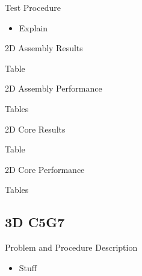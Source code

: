 \begin{frame}[t]{Test Procedure}
    
    \begin{itemize}
        \item Explain
    \end{itemize}
    
\end{frame}


\begin{frame}[t]{2D Assembly Results}
    
    Table
    
\end{frame}


\begin{frame}[t]{2D Assembly Performance}

Tables

\end{frame}


\begin{frame}[t]{2D Core Results}

Table

\end{frame}


\begin{frame}[t]{2D Core Performance}

Tables

\end{frame}


\subsection{3D C5G7}
\begin{frame}[t]{Problem and Procedure Description}
    
    \begin{itemize}
        \item Stuff
    \end{itemize}

\end{frame}

